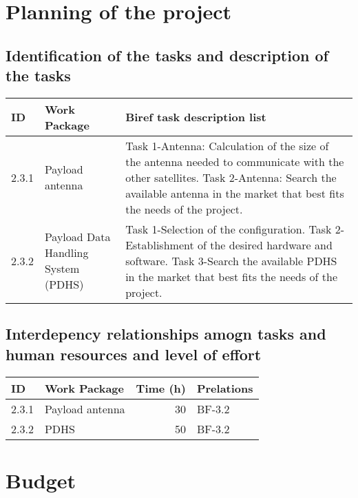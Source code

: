 \documentclass[12pt, titlepage]{article}
\begin{document}
\maketitle

\pagebreak


\section{Planning of the project}


\subsection{Identification of the tasks and description of the tasks}
\begin{tabular}{ | l | l | p{7cm} |}
\hline
ID & Work Package & Biref task description list\\ \hline
2.3.1 & Payload antenna &  Task 1-Antenna: Calculation of the size of the antenna needed to communicate with the other satellites. \newline
Task 2-Antenna: Search the available antenna in the market that best fits the needs of the project.
\\
\hline
2.3.2 & Payload Data Handling System (PDHS) &  Task 1-Selection of the configuration. \newline
Task 2-Establishment of the desired hardware and software.
\newline
Task 3-Search the available PDHS in the market that best fits the needs of the project.
\\
\hline
\end{tabular}


\subsection{Interdepency relationships amogn tasks and human resources and level of effort}
\begin{tabular}{ | l | l | r | p{5cm} | }
\hline
ID & Work Package & Time (h) & Prelations \\ \hline
2.3.1 & Payload antenna & 30 & BF-3.2 \\ \hline
2.3.2 & PDHS & 50 & BF-3.2 \\ \hline
\end{tabular}


\section{Budget}
\end{document}

